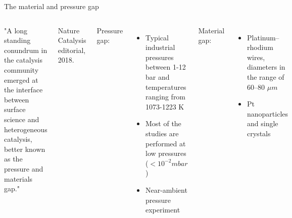 \begin{frame}{The material and pressure gap}

    \begin{columns}

        
        \huge\textcolor{Important}{"A long standing conundrum in the catalysis community emerged at the interface between surface science and heterogeneous catalysis, better known as the pressure and materials gap."}
        
        \large\textcolor{Important}{Nature Catalysis editorial, 2018.}
        

        Pressure gap:
        \begin{itemize}
            \item Typical industrial pressures between 1-12 bar and temperatures ranging from 1073-1223 K
            \item Most of the studies are performed at low pressures ($< 10^{-2} mbar$)
            \item Near-ambient pressure experiment
        \end{itemize}

        \vspace{2cm}
        Material gap:
        \begin{itemize}
            \item Platinum–rhodium wires, diameters in the range of 60–80 $\mu m$
            \item Pt nanoparticles and single crystals
        \end{itemize}



    \end{columns}

\end{frame}